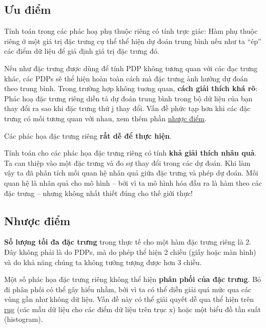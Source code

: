 \subsection{Ưu điểm}
Tính toán trong các phác hoạ phụ thuộc riêng có tính trực giác: Hàm phụ thuộc riêng ở một giá trị đặc trưng cụ thể thể hiện dự đoán trung bình nếu như ta “ép” các điểm dữ liệu để giả định giá trị đặc trưng đó. 

Nếu như đặc trưng được dùng để tính PDP không tương quan với các đạc trưng khác, các PDPs sẽ thể hiện hoàn toàn cách mà đặc trưng ảnh hưởng dự đoán theo trung bình. Trong trường hợp không tuơng quan, \textbf{cách giải thích khá rõ}: Phác hoạ đặc trưng riêng diễn tả dự đoán trung bình trong bộ dữ liệu của bạn thay đổi ra sao khi đặc trưng thứ j thay đổi. Vấn đề phức tạp hơn khi các đặc trưng có mối tương quan với nhau, xem thêm phần \href{disa_5.1}{
nhược điểm}.

Các phác họa đặc trưng riêng \textbf{rất dễ để thực hiện}.

Tính toán cho các phác họa đặc trưng riêng có tính \textbf{khả giải thích nhân quả}. Ta can thiệp vào một đặc trưng và đo sự thay đổi trong các dự đoán. Khi làm vậy ta đã phân tích mối quan hệ nhân quả giữa đặc trưng và phép dự đoán. Mối quan hệ là nhân quả cho mô hình – bởi vì ta mô hình hóa đầu ra là hàm theo các đặc trưng – nhưng không nhất thiết đúng cho thế giới thực!

\subsection{Nhược điểm}\label{disa_5.1}
\textbf{Số lượng tối đa đặc trưng} trong thực tế cho một hàm đặc trưng riêng là 2. Đây không phải là do PDPs, mà do phép thể hiện 2 chiều (giấy hoặc màn hình) và do khả năng chúng ta không tưởng tượng được hơn 3 chiều.

Một số phác họa đặc trưng riêng không thể hiện \textbf{phân phối của đặc trưng}. Bỏ đi phân phối có thể gây hiểu nhầm, bởi vì ta có thể diễn giải quá mức qua các vùng gần như không dữ liệu. Vấn đề này có thể giải quyết dễ qua thể hiện trên \href{https://www.mathworks.com/matlabcentral/fileexchange/27582-rug-plots}{rug} (các mẫu dữ liệu cho các điểm dữ liệu trên trục x) hoặc một biểu đồ tần suất (histogram).

